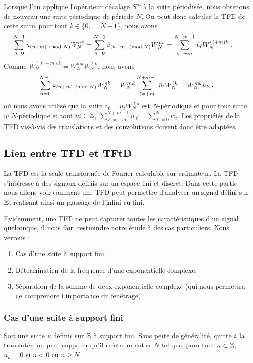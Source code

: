 Lorsque l'on applique l'op\'erateur décalage $S^m$ à la suite p\'eriodis\'ee, nous obtenons de nouveau une suite p\'eriodique de p\'eriode $N$.
On peut donc calculer la TFD de cette suite, pour tout $k \in \{0,\dots,N-1\}$, nous avons
\begin{align*}
\sum_{n=0}^{N-1} u_{ (n+m) \pmod{N}} W_N^{nk} &= \sum_{n=0}^{N-1} \tilde{u}_{(n+m) \pmod{N}} W_N^{nk}= \sum_{\ell=+m}^{N+m-1} \tilde{u}_{\ell} W_N^{(\ell + m)k} \;.
\end{align*}
Comme  $W_N^{(\ell +m)k}= W_N^{mk} W_N^{\ell k}$, nous avons
\[
\sum_{n=0}^{N-1} u_{ (n+m) \pmod{N}} W_N^{nk} = W_N^{mk} \sum_{\ell=+m}^{N+m-1} \tilde{u}_{\ell} W_N^{\ell k}= W_N^{mk} \hat{u}_k \;,
\]
où nous avons utilis\'e que la suite $v_\ell= \tilde{u}_{\ell} W_N^{\ell k}$ est $N$-p\'eriodique et pour tout suite $w$ $N$-p\'eriodique et tout $m \in \mathbb{Z}$, $\sum_{\ell=+m}^{N+m-1} w_{\ell}= \sum_{\ell=0}^{N-1} w_\ell$. Les propriétés de la TFD vis-à-vis des translations et des convolutions doivent donc être adaptées.



\subsection{Lien entre TFD et TFtD}
La TFD est la seule transform\'{e}e de Fourier calculable sur ordinateur.  La TFD s'int\'{e}resse \`{a} des signaux d\'{e}finis sur un espace fini et discret.  Dans cette partie nous allons voir comment une TFD peut permettre d'analyser un signal d\'{e}fini sur $\mathbb{Z}$, r\'{e}alisant ainsi un p,assage de l'infini au fini.

Evidemment, une TFD ne peut capturer toutes les caract\'{e}ristiques d'un signal quelconque, il nous faut restreindre notre \'{e}tude \`{a} des cas particuliers. Nous verrons :
\begin{enumerate}
\item Cas d'une suite \`{a} support fini.
\item D\'{e}termination de la fr\'{e}quence d'une exponentielle complexe.
\item S\'{e}paration de la somme de deux exponentielle complexe (qui nous permettra de comprendre l'importance du fenêtrage)
\end{enumerate}

\subsubsection{Cas d'une suite \`{a} support fini}
Soit une suite $u$ d\'{e}finie sur $\mathbb{Z}$ \`{a} support fini. Sans perte de g\'{e}n\'{e}ralit\'{e}, quitte \`{a} la translater, on peut supposer qu'il existe un entier $N$ tel que, pour tout  $n\in \mathbb{Z}$, $u_{n}=0$ si $n<0$ ou $n\geq N$

